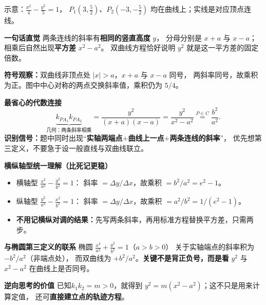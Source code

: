 \clearpage
\begin{explanationbox}
\begin{center}
 
 
 {\small\color{black!65}示意：$\frac{x^2}{4}-\frac{y^2}{5}=1$，
 $P_1(3,\frac52)$、$P_2(-3,-\frac52)$ 均在曲线上；实线是对应顶点连线。}
\end{center}
\textbf{\textcolor{CExplanation}{一句话直觉}}
两条连线的斜率有\textbf{相同的竖直高度} \(y\)，
分母分别是 \(x+a\) 与 \(x-a\)；相乘后自然出现\textbf{平方差} \(x^2-a^2\)。
双曲线方程恰好说明 \(y^2\) 就是这一平方差的固定倍数。

\medskip
\textbf{符号观察：}双曲线非顶点处 $|x|>a$，$x+a$ 与 $x-a$ 同号，
两斜率同号，故乘积为正。图中中心对称的两点交换斜率值，乘积仍为 $5/4$。

\textbf{\textcolor{CExplanation}{最省心的代数连接}}
\[
 \underbrace{k_{PA_1}k_{PA_2}}_{\text{几何：两条斜率相乘}}
 =\frac{y^2}{(x+a)(x-a)}
 =\frac{y^2}{x^2-a^2}
 \overset{P\in C}{=}\frac{b^2}{a^2}.
\]
\textbf{识别信号：}题中同时出现“\textbf{实轴两端点}\(+\)\textbf{曲线上一点}\(+\)\textbf{两条连线的斜率}”，
优先想第三定义，不要急于设一般直线与双曲线联立。

\medskip
\textbf{\textcolor{CExplanation}{横纵轴型统一理解（比死记更稳）}}
\begin{itemize}[leftmargin=*,itemsep=0.35em]
 \item 横轴型 \(\frac{x^2}{a^2}-\frac{y^2}{b^2}=1\)：
 斜率 \(=\Delta y/\Delta x\)，故乘积 \(=b^2/a^2=e^2-1\)。
 \item 纵轴型 \(\frac{y^2}{a^2}-\frac{x^2}{b^2}=1\)：
 斜率 \(=\Delta y/\Delta x\)，故乘积 \(=a^2/b^2=1/(e^2-1)\)。
 \item \textbf{不用记横纵对调的结果：}先写两条斜率，再用标准方程替换平方差，只需两步。
\end{itemize}

\textbf{\textcolor{CExplanation}{与椭圆第三定义的联系}}
椭圆 \(\frac{x^2}{a^2}+\frac{y^2}{b^2}=1\)（\(a>b>0\)）
关于实轴端点的斜率积为 \(-b^2/a^2\)（非端点处），
而双曲线为 \(+b^2/a^2\)。\textbf{关键不是背正负号，而是看}
\(y^2\) 与 \(x^2-a^2\) 在曲线上是否同号。

\textbf{\textcolor{CExplanation}{逆向思考的价值}}
已知\(k_1k_2=m>0\)，就得到
\(y^2=m(x^2-a^2)\)；这不只是用来计算定值，
还可\textbf{直接建立点的轨迹方程}。

\medskip
\end{explanationbox}
\clearpage
